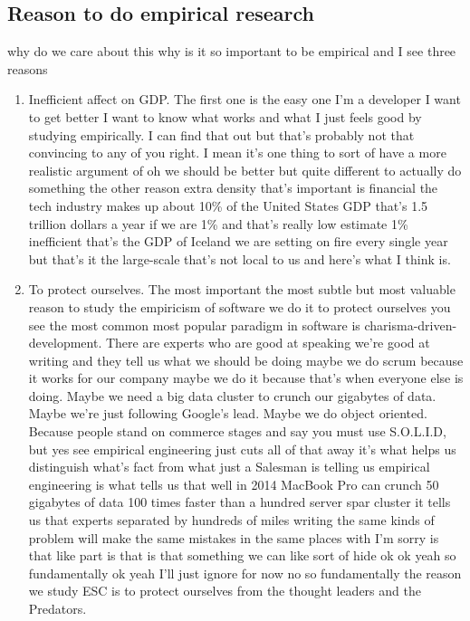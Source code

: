 \documentclass[conference, compsoc, twoside]{IEEEtran}
\begin{document}
\subsection{Reason to do empirical research} %
why do we care about this why is it so important to be empirical and I see three reasons
\begin{enumerate}
  \item Inefficient affect on GDP.
The first one is the easy one I'm a
developer I want to get better I want to
know what works and what I just feels
good by studying empirically.
I can find that out but that's probably not that convincing to any of you right.
I mean it's one thing to sort of have a more realistic argument of oh we should be better but quite different to actually do something the other reason extra density that's
important is financial the tech industry makes up about 10\% of the United States GDP that's 1.5 trillion dollars a year
if we are 1\% and that's really low estimate 1\% inefficient that's the GDP of Iceland we are setting on fire every single year but that's it the large-scale that's not local to us and here's what I think is.
  \item To protect ourselves.
The most important the most subtle but most valuable reason to study the empiricism of software we do it to protect
ourselves you see the most common most popular paradigm in software is charisma-driven-development.
There are experts who are good at speaking we're good at writing and they tell us what we should be doing maybe we do scrum because it works for our company maybe we do it
because that's when everyone else is doing. 
Maybe we need a big data cluster to crunch our gigabytes of data.
Maybe we're just following Google's lead.
Maybe we do object oriented.
Because people stand on commerce stages and say you must use S.O.L.I.D, but yes see empirical engineering just cuts all of
that away it's what helps us distinguish
what's fact from what just a Salesman is
telling us empirical engineering is what
tells us that well in 2014 MacBook Pro
can crunch 50 gigabytes of data 100
times faster than a hundred server spar
cluster it tells us that experts separated by hundreds of miles writing the same kinds of problem will make the same mistakes in the same places with I'm sorry is that like part is that is that something we can like sort of hide ok ok yeah so fundamentally ok yeah I'll just ignore for now no so fundamentally the reason we study ESC is to protect ourselves from the thought leaders and the Predators.
\end{enumerate}
\end{document}
